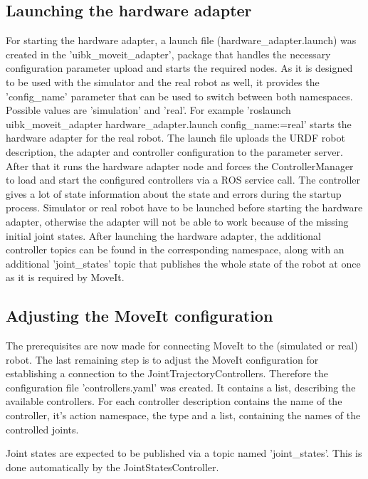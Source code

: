 \subsection{Launching the hardware adapter}

For starting the hardware adapter, a launch file (hardware\_adapter.launch) was created in the 'uibk\_moveit\_adapter', package that handles the necessary configuration parameter upload and starts the required nodes. As it is designed to be used with the simulator and the real robot as well, it provides the 'config\_name' parameter that can be used to switch between both namespaces. Possible values are 'simulation' and 'real'. For example 'roslaunch uibk\_moveit\_adapter hardware\_adapter.launch config\_name:=real' starts the hardware adapter for the real robot. The launch file uploads the URDF robot description, the adapter and controller configuration to the parameter server. After that it runs the hardware adapter node and forces the ControllerManager to load and start the configured controllers via a ROS service call. The controller gives a lot of state information about the state and errors during the startup process. Simulator or real robot have to be launched before starting the hardware adapter, otherwise the adapter will not be able to work because of the missing initial joint states. After launching the hardware adapter, the additional controller topics can be found in the corresponding namespace, along with an additional 'joint\_states' topic that publishes the whole state of the robot at once as it is required by MoveIt.

\subsection{Adjusting the MoveIt configuration}

The prerequisites are now made for connecting MoveIt to the (simulated or real) robot. The last remaining step is to adjust the MoveIt configuration for establishing a connection to the JointTrajectoryControllers. Therefore the configuration file 'controllers.yaml' was created. It contains a list, describing the available controllers. For each controller description contains the name of the controller, it's action namespace, the type and a list, containing the names of the controlled joints.

Joint states are expected to be published via a topic named 'joint\_states'. This is done automatically by the JointStatesController.

